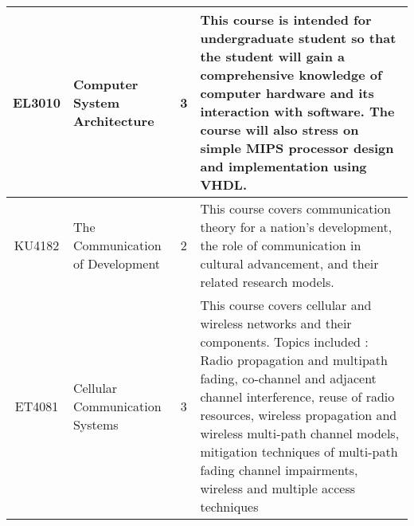 \documentclass{article}
\begin{document}
\begin{center}
\begin{tabular}{ | c | B{5.4cm} | c | p{6.8cm} |}
            EL3010 & Computer System Architecture & 3 & This course is intended for undergraduate student so that the student will gain a comprehensive knowledge of computer hardware and its interaction with software. The course will also stress on simple MIPS processor design and implementation using VHDL. \\ \hline    
            
            KU4182 & The Communication of Development & 2 & This course covers communication theory for a nation's development, the role of communication in cultural advancement, and their related research models. \\ \hline
           
            ET4081 & Cellular Communication Systems & 3 & This course covers cellular and wireless networks and their components. Topics included : Radio propagation and multipath fading, co-channel and adjacent channel interference, reuse of radio resources, wireless propagation and wireless multi-path channel models, mitigation techniques of multi-path fading channel impairments, wireless and multiple access techniques  \\ \hline               
                                                    		                                                  
        \end{tabular}
    \end{center} 
    
    \newpage
    
    
\end{document}

